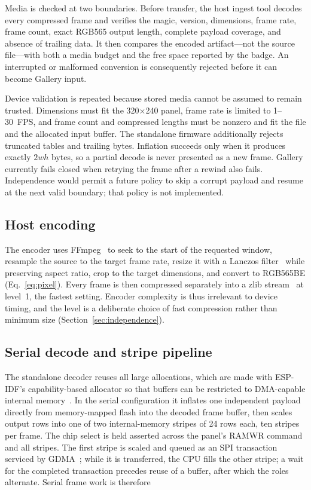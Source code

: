 \documentclass[11pt,twocolumn]{article}
\begin{document}
Media is checked at two boundaries.  Before transfer, the host ingest tool
decodes every compressed frame and verifies the magic, version, dimensions,
frame rate, frame count, exact RGB565 output length, complete payload
coverage, and absence of trailing data.  It then compares the encoded
artifact---not the source file---with both a media budget and the free space
reported by the badge.  An interrupted or malformed conversion is consequently
rejected before it can become Gallery input.

Device validation is repeated because stored media cannot be assumed to remain
trusted.  Dimensions must fit the 320$\times$240 panel, frame rate is limited
to 1--30~FPS, and frame count and compressed lengths must be nonzero and fit
the file and the allocated input buffer.  The standalone firmware
additionally rejects truncated tables and trailing bytes.  Inflation succeeds
only when it produces exactly $2wh$ bytes, so a partial decode is never
presented as a new frame.  Gallery currently fails closed when retrying the
frame after a rewind also fails.  Independence would permit a future policy
to skip a corrupt payload and resume at the next valid boundary; that policy
is not implemented.

\subsection{Host encoding}

The encoder uses FFmpeg~\cite{ffmpeg} to seek to the
start of the requested window, resample the source to the target frame rate,
resize it with a Lanczos filter~\cite{duchon1979lanczos} while preserving
aspect ratio, crop to the target dimensions, and convert to RGB565BE
(Eq.~\eqref{eq:pixel}).  Every frame is then compressed separately into a
zlib stream~\cite{deutsch1996zlib} at level~1, the fastest setting.  Encoder
complexity is thus irrelevant to device timing, and the level is a deliberate
choice of fast compression rather than minimum size
(Section~\ref{sec:independence}).

\subsection{Serial decode and stripe pipeline}

The standalone decoder reuses all large allocations, which are made
with ESP-IDF's capability-based allocator so that buffers can be restricted
to DMA-capable internal memory~\cite{espressif2026memalloc}.  In the serial
configuration it inflates one independent payload directly from
memory-mapped flash into the decoded frame buffer, then scales output rows
into one of two internal-memory stripes of 24 rows each, ten stripes per
frame.  The chip select is held asserted across the panel's RAMWR command and
all stripes.  The first stripe is scaled and queued as an SPI transaction
serviced by GDMA~\cite{espressif2026spi,espressif2024trm}; while it is
transferred, the CPU fills the other stripe; a wait for the completed
transaction precedes reuse of a buffer, after which the roles alternate.
Serial frame work is therefore
\end{document}
